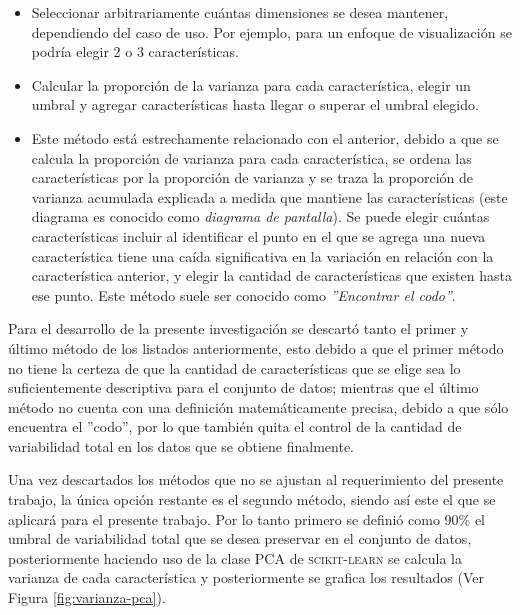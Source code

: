 \begin{itemize}
\item Seleccionar arbitrariamente cu\'{a}ntas dimensiones se desea mantener, dependiendo del caso de uso. Por ejemplo, para un enfoque de visualizaci\'{o}n se podr\'{i}a elegir 2 o 3 caracter\'{i}sticas.
\item Calcular la proporci\'{o}n de la varianza para cada caracter\'{i}stica, elegir un umbral y agregar  caracter\'{i}sticas hasta llegar o superar el umbral elegido.
\item Este m\'{e}todo est\'{a} estrechamente relacionado con el anterior, debido a que se calcula la proporci\'{o}n de varianza para cada caracter\'{i}stica, se ordena las caracter\'{i}sticas por la proporci\'{o}n de varianza y se traza la proporci\'{o}n de varianza acumulada explicada a medida que mantiene las caracter\'{i}sticas (este diagrama es conocido como \textit{diagrama de pantalla}). Se puede elegir cu\'{a}ntas caracter\'{i}sticas incluir al identificar el punto en el que se agrega una nueva caracter\'{i}stica tiene una ca\'{i}da significativa en la variaci\'{o}n en relaci\'{o}n con la caracter\'{i}stica anterior, y elegir la cantidad de caracter\'{i}sticas que existen hasta ese punto. Este m\'{e}todo suele ser conocido como \textit{''Encontrar el codo''}.
\end{itemize}

Para el desarrollo de la presente investigaci\'{o}n se descart\'{o} tanto el primer y \'{u}ltimo m\'{e}todo de los listados anteriormente, esto debido a que el primer m\'{e}todo no tiene la certeza de que la cantidad de caracter\'{i}sticas que se elige sea lo suficientemente descriptiva para el conjunto de datos; mientras que el \'{u}ltimo m\'{e}todo no cuenta con una definici\'{o}n matem\'{a}ticamente precisa, debido a que s\'{o}lo encuentra el ''codo'', por lo que tambi\'{e}n quita el control de la cantidad de variabilidad total en los datos que se obtiene finalmente.

\vspace{5mm} %

Una vez descartados los m\'{e}todos que no se ajustan al requerimiento del presente trabajo, la \'{u}nica opci\'{o}n restante es el segundo m\'{e}todo, siendo as\'{i} este el que se aplicar\'{a} para el presente trabajo. Por lo tanto primero se defini\'{o} como 90\% el umbral de variabilidad total que se desea preservar en el conjunto de datos, posteriormente haciendo uso de la clase PCA de \textsc{scikit-learn} se calcula la varianza de cada caracter\'{i}stica y posteriormente se grafica los resultados (Ver Figura \ref{fig:varianza-pca}).

